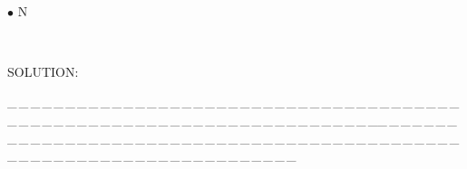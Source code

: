\documentclass[a4paper, 11pt, UTF8]{article}
\begin{document}
\begin{large}
\par{\tiny\,\par}

{\small $\bullet$}
{\timesbf\Large N} {\timessl\Large 
}\par\quad\,
{\timessl\Large
}\par
{\timesbf S\footnotesize{OLUTION:}}\par\quad

\par
{\tiny \_\,\_\,\_\,\_\,\_\,\_\,\_\,\_\,\_\,\_\,\_\,\_\,\_\,\_\,\_\,\_\,\_\,\_\,\_\,\_\,\_\,\_\,\_\,\_\,\_\,\_\,\_\,\_\,\_\,\_\,\_\,\_\,\_\,\_\,\_\,\_\,\_\,\_\,\_\,\_\,\_\,\_\,\_\,\_\,\_\,\_\,\_\,\_\,\_\,\_\,\_\,\_\,\_\,\_\,\_\,\_\,\_\,\_\,\_\,\_\,\_\,\_\,\_\,\_\,\_\,\_\,\_\,\_\,\_\,\_\,\_\_\,\_\,\_\,\_\,\_\,\_\,\_\,\_\,\_\,\_\,\_\,\_\,\_\,\_\,\_\,\_\,\_\,\_\,\_\,\_\,\_\,\_\,\_\,\_\,\_\,\_\,\_\,\_\,\_\,\_\,\_\,\_\,\_\,\_\,\_\,\_\,\_\,\_\,\_\,\_\,\_\,\_\,\_\,\_\,\_\,\_\,\_\,\_\,\_\,\_\,\_\,\_\,\_\,\_\,\_\,\_\,\_\,\_\,\_\,\_\,\_\,\_\,\_\,\_\,\_\,\_\,\_\,\_\,\_\,\_\,\_}\par


\end{large}
\end{document}
